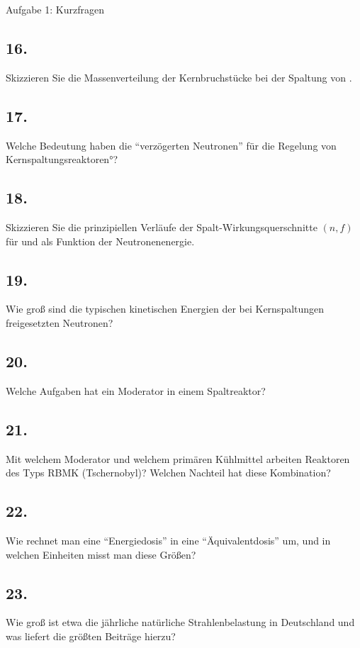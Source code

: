 \begin{aufgabe}{Aufgabe 1: Kurzfragen}
    \subsection{16.}
    Skizzieren Sie die Massenverteilung der Kernbruchstücke bei der Spaltung von .

    \subsection{17.}
    Welche Bedeutung haben die \enquote{verzögerten Neutronen} für die Regelung von Kernspaltungsreaktoren°?

    \subsection{18.}
    Skizzieren Sie die prinzipiellen Verläufe der Spalt-Wirkungsquerschnitte $(n, f)$ für  und  als Funktion der Neutronenenergie.

    \subsection{19.}
    Wie groß sind die typischen kinetischen Energien der bei Kernspaltungen freigesetzten Neutronen?

    \subsection{20.}
    Welche Aufgaben hat ein Moderator in einem Spaltreaktor?

    \subsection{21.}
    Mit welchem Moderator und welchem primären Kühlmittel arbeiten Reaktoren des Typs RBMK (Tschernobyl)?
    Welchen Nachteil hat diese Kombination?

    \subsection{22.}
    Wie rechnet man eine \enquote{Energiedosis} in eine \enquote{Äquivalentdosis} um,
    und in welchen Einheiten misst man diese Größen?

    \subsection{23.}
    Wie groß ist etwa die jährliche natürliche Strahlenbelastung in Deutschland
    und was liefert die größten Beiträge hierzu?


\end{aufgabe}
